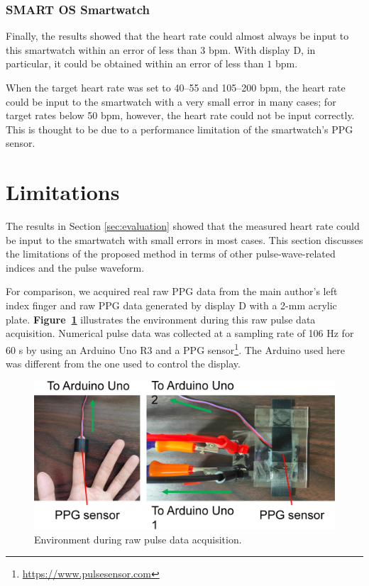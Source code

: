 \documentclass[sigchi,authordraft]{acmart}
\newcommand\figref[1]{\textbf{Figure~\ref{fig:#1}}}
\begin{document}
\subsubsection{SMART OS Smartwatch}
Finally, the results showed that the heart rate could almost always be input to this smartwatch within an error of less than $3$ bpm. With display D, in particular, it could be obtained within an error of less than $1$ bpm.\par

When the target heart rate was set to 40--55 and 105--200 bpm, the heart rate could be input to the smartwatch with a very small error in many cases; for target rates below 50 bpm, however, the heart rate could not be input correctly. This is thought to be due to a performance limitation of the smartwatch's PPG sensor.



\section{Limitations}
\label{sec:limitation}
The results in Section \ref{sec:evaluation} showed that the measured heart rate could be input to the smartwatch with small errors in most cases. This section discusses the limitations of the proposed method in terms of other pulse-wave-related indices and the pulse waveform.\par

For comparison, we acquired real raw PPG data from the main author's left index finger and raw PPG data generated by display D with a 2-mm acrylic plate. \figref{raw_data_acquisition} illustrates the environment during this raw pulse data acquisition. Numerical pulse data was collected at a sampling rate of 106 Hz for 60 s by using an Arduino Uno R3 and a PPG sensor\footnote{\url{https://www.pulsesensor.com}}. The Arduino used here was different from the one used to control the display.

\begin{figure}[!t]
  \centering
  \includegraphics[width=1\linewidth]{figures/raw_data_acquisition.eps}
  \caption{Environment during raw pulse data acquisition.}
  \label{fig:raw_data_acquisition}
\end{figure}
\end{document}
